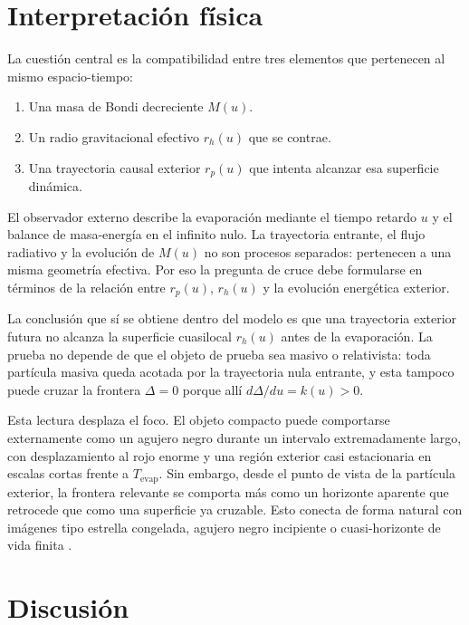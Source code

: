 \documentclass[
aps,
prd,
reprint,
superscriptaddress,
nofootinbib,
amsmath,
amssymb
]{revtex4-2}
\begin{document}
\section{Interpretación física}

La cuestión central es la compatibilidad entre tres elementos que pertenecen al mismo espacio-tiempo:

\begin{enumerate}
\item Una masa de Bondi decreciente $M(u)$.
\item Un radio gravitacional efectivo $r_h(u)$ que se contrae.
\item Una trayectoria causal exterior $r_p(u)$ que intenta alcanzar esa superficie dinámica.
\end{enumerate}

El observador externo describe la evaporación mediante el tiempo retardo $u$ y el balance de masa-energía en el infinito nulo. La trayectoria entrante, el flujo radiativo y la evolución de $M(u)$ no son procesos separados: pertenecen a una misma geometría efectiva. Por eso la pregunta de cruce debe formularse en términos de la relación entre $r_p(u)$, $r_h(u)$ y la evolución energética exterior.

La conclusión que sí se obtiene dentro del modelo es que una trayectoria exterior futura no alcanza la superficie cuasilocal $r_h(u)$ antes de la evaporación. La prueba no depende de que el objeto de prueba sea masivo o relativista: toda partícula masiva queda acotada por la trayectoria nula entrante, y esta tampoco puede cruzar la frontera $\Delta=0$ porque allí $d\Delta/du=k(u)>0$.

Esta lectura desplaza el foco. El objeto compacto puede comportarse externamente como un agujero negro durante un intervalo extremadamente largo, con desplazamiento al rojo enorme y una región exterior casi estacionaria en escalas cortas frente a $T_{\mathrm{evap}}$. Sin embargo, desde el punto de vista de la partícula exterior, la frontera relevante se comporta más como un horizonte aparente que retrocede que como una superficie ya cruzable. Esto conecta de forma natural con imágenes tipo estrella congelada, agujero negro incipiente o cuasi-horizonte de vida finita \cite{Vachaspati2007,Barcelo2008,Visser2014,Bardeen2014}.

\section{Discusión}
\end{document}
